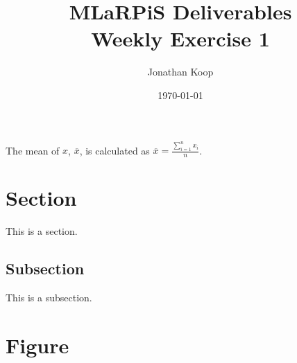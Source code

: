 \documentclass[10pt, a4paper, titlepage]{article}
\title{MLaRPiS Deliverables\\ \small Weekly Exercise 1}
\author{Jonathan Koop}
\date{\today}
\begin{document}
\maketitle
\newpage

The mean of $x$, $\overline{x}$, is calculated as $\overline{x}= \frac{\sum_{i=1}^{n} x_i}{n}$.

\section{Section}
This is a section.

\subsection{Subsection}
This is a subsection.

\section{Figure}
\end{document}

